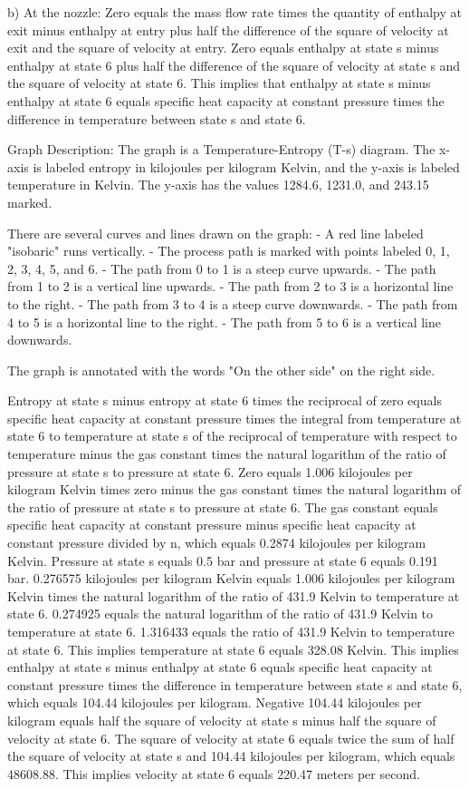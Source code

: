 b) At the nozzle:
Zero equals the mass flow rate times the quantity of enthalpy at exit minus enthalpy at entry plus half the difference of the square of velocity at exit and the square of velocity at entry.
Zero equals enthalpy at state s minus enthalpy at state 6 plus half the difference of the square of velocity at state s and the square of velocity at state 6.
This implies that enthalpy at state s minus enthalpy at state 6 equals specific heat capacity at constant pressure times the difference in temperature between state s and state 6.

Graph Description:
The graph is a Temperature-Entropy (T-s) diagram. The x-axis is labeled entropy in kilojoules per kilogram Kelvin, and the y-axis is labeled temperature in Kelvin. The y-axis has the values 1284.6, 1231.0, and 243.15 marked.

There are several curves and lines drawn on the graph:
- A red line labeled "isobaric" runs vertically.
- The process path is marked with points labeled 0, 1, 2, 3, 4, 5, and 6.
- The path from 0 to 1 is a steep curve upwards.
- The path from 1 to 2 is a vertical line upwards.
- The path from 2 to 3 is a horizontal line to the right.
- The path from 3 to 4 is a steep curve downwards.
- The path from 4 to 5 is a horizontal line to the right.
- The path from 5 to 6 is a vertical line downwards.

The graph is annotated with the words "On the other side" on the right side.

Entropy at state s minus entropy at state 6 times the reciprocal of zero equals specific heat capacity at constant pressure times the integral from temperature at state 6 to temperature at state s of the reciprocal of temperature with respect to temperature minus the gas constant times the natural logarithm of the ratio of pressure at state s to pressure at state 6.
Zero equals 1.006 kilojoules per kilogram Kelvin times zero minus the gas constant times the natural logarithm of the ratio of pressure at state s to pressure at state 6.
The gas constant equals specific heat capacity at constant pressure minus specific heat capacity at constant pressure divided by n, which equals 0.2874 kilojoules per kilogram Kelvin.
Pressure at state s equals 0.5 bar and pressure at state 6 equals 0.191 bar.
0.276575 kilojoules per kilogram Kelvin equals 1.006 kilojoules per kilogram Kelvin times the natural logarithm of the ratio of 431.9 Kelvin to temperature at state 6.
0.274925 equals the natural logarithm of the ratio of 431.9 Kelvin to temperature at state 6.
1.316433 equals the ratio of 431.9 Kelvin to temperature at state 6.
This implies temperature at state 6 equals 328.08 Kelvin.
This implies enthalpy at state s minus enthalpy at state 6 equals specific heat capacity at constant pressure times the difference in temperature between state s and state 6, which equals 104.44 kilojoules per kilogram.
Negative 104.44 kilojoules per kilogram equals half the square of velocity at state s minus half the square of velocity at state 6.
The square of velocity at state 6 equals twice the sum of half the square of velocity at state s and 104.44 kilojoules per kilogram, which equals 48608.88.
This implies velocity at state 6 equals 220.47 meters per second.
